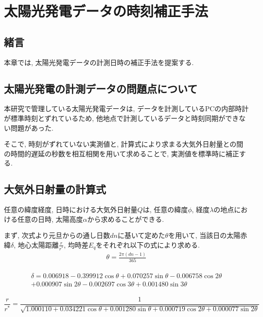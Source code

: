 
\chapter{太陽光発電データの時刻補正手法}
\label{chap:second}

\section{緒言}
本章では, 太陽光発電データの計測日時の補正手法を提案する.


\section{太陽光発電の計測データの問題点について}
本研究で管理している太陽光発電データは, データを計測しているPCの内部時計が標準時刻とずれているため, 他地点で計測しているデータと時刻同期ができない問題があった. 

そこで, 時刻がずれていない実測値と, 計算式により求まる大気外日射量との間の時間的遅延の秒数を相互相関を用いて求めることで, 実測値を標準時に補正する.

\section{大気外日射量の計算式}
任意の緯度経度, 日時における大気外日射量$Q$は, 任意の緯度$\phi$, 経度$\lambda$の地点における任意の日時, 太陽高度$\alpha$から求めることができる.

まず, 次式より元旦からの通し日数$dn$に基いて定めた$\theta$を用いて, 当該日の太陽赤緯$\delta$, 地心太陽距離$\frac{r}{r^{*}}$, 均時差$E_q$をそれぞれ以下の式により求める.
\begin{eqnarray}
  \theta =  \frac{2\pi (dn-1)}{365}
\end{eqnarray}

\begin{eqnarray}
  \begin{split}
    \delta =  0.006918-0.399912\cos \theta+0.070257\sin \theta-0.006758\cos 2\theta\\
    +0.000907\sin 2\theta-0.002697\cos 3\theta+0.001480\sin 3\theta
  \end{split}
\end{eqnarray}

\begin{dmath}
  \frac{r}{r^{*}} =  \frac{1}{\sqrt{1.000110+0.034221\cos \theta+0.001280\sin \theta+0.000719\cos 2\theta+0.000077\sin 2\theta}}
\end{dmath}

